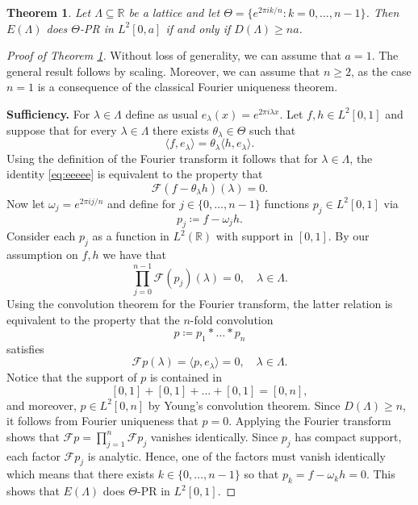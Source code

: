 \documentclass[10pt,a4paper]{amsart}
\newtheorem{theorem}{Theorem}
\def\R{{\mathbb R}}
\newcommand{\ft}{{\mathcal{F}}}
\begin{document}
\begin{theorem}\label{thm:lattice_density_characterization}
    Let $\Lambda \subseteq \R$ be a lattice and let $\Theta = \{ e^{2\pi i k/n} : k=0,\dots,n-1 \}$. Then $E(\Lambda)$ does $\Theta$-PR in $L^2[0,a]$ if and only if $D(\Lambda) \geq na$.
\end{theorem}

\begin{proof}[Proof of Theorem \ref{thm:lattice_density_characterization}]
Without loss of generality, we can assume that $a=1$. The general result follows by scaling. Moreover, we can assume that $n \geq 2$, as the case $n=1$ is a consequence of the classical Fourier uniqueness theorem.

\textbf{Sufficiency.}
For $\lambda \in \Lambda$ define as usual $e_\lambda(x) = e^{2\pi i \lambda x}$. Let $f,h \in L^2[0,1]$ and suppose that for every $\lambda \in \Lambda$ there exists $\theta_\lambda \in \Theta$ such that
\begin{equation}\label{eq:eeeee}
    \langle f,e_\lambda \rangle = \theta_\lambda \langle h,e_\lambda \rangle.
\end{equation}
Using the definition of the Fourier transform it follows that for $\lambda \in \Lambda$, the identity \eqref{eq:eeeee} is equivalent to the property that
$$
\ft(f-\theta_\lambda h)(\lambda) =0.
$$
Now let $\omega_j=e^{2\pi i j/n}$ and define for $j \in \{ 0, \dots, n-1 \}$ functions $p_j \in L^2[0,1]$ via
\begin{equation}\label{eq:prod_analytic}
        p_j \coloneqq  f - \omega_j h.
    \end{equation}
Consider each $p_j$ as a function in $L^2(\R)$ with support in $[0,1]$. By our assumption on $f,h$ we have that
$$
\prod_{j=0}^{n-1} \ft(p_j)(\lambda) = 0, \quad \lambda \in \Lambda.
$$
Using the convolution theorem for the Fourier transform, the latter relation is equivalent to the property that the $n$-fold convolution
$$
p \coloneqq p_1 * \dots * p_n
$$
satisfies
$$
\ft p(\lambda) = \langle p, e_\lambda \rangle =0, \quad \lambda \in \Lambda.
$$
Notice that the support of $p$ is contained in
$$
[0,1] + [0,1] + \dots + [0,1] = [0,n],
$$
and moreover, $p \in L^2[0,n]$ by Young's convolution theorem. Since $D(\Lambda) \geq n$, it follows from Fourier uniqueness that $p=0$. Applying the Fourier transform shows that
$
\ft p = \prod_{j=1}^n \ft p_j
$
vanishes identically. Since $p_j$ has compact support, each factor $\ft p_j$ is analytic. Hence, one of the factors must vanish identically which means that there exists $k \in \{0, \dots, n-1 \}$ so that $p_k = f- \omega_k h =0$. This shows that $E(\Lambda)$ does $\Theta$-PR in $L^2[0,1]$.


\end{proof}
\end{document}
